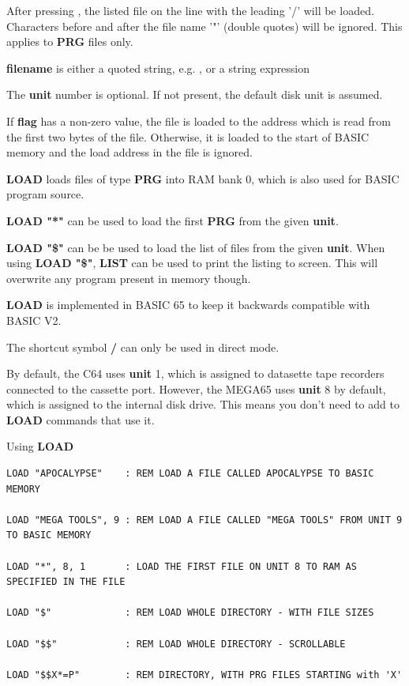 \begin{description}[leftmargin=2cm,style=nextline]
                  After pressing , the listed file on the line with the leading '/' will be loaded. Characters before and after the file name '"' (double quotes) will be ignored. This applies to {\bf PRG} files only.

                  {\bf filename} is either a quoted string, e.g. , or a string expression 

                  The {\bf unit} number is optional. If not present, the default disk unit is assumed.

                  If {\bf flag} has a non-zero value, the file is loaded to the address which is read from the first two bytes of the file. Otherwise, it is loaded to the start of BASIC memory and the load address in the file is ignored.

\item [Remarks:]  {\bf LOAD} loads files of type {\bf PRG} into RAM bank 0, which is also used for BASIC program source.

                  {\bf LOAD "*"} can be used to load the first {\bf PRG} from the given {\bf unit}.

                  {\bf LOAD "\$"} can be be used to load the list of files from the given {\bf unit}. When using {\bf LOAD "\$"}, {\bf LIST} can be used to print the listing to screen. This will overwrite any program present in memory though.

                  {\bf LOAD} is implemented in BASIC 65 to keep it backwards compatible with BASIC V2.

                  The shortcut symbol {\bf /} can only be used in direct mode.

                  By default, the C64 uses {\bf unit} 1, which is assigned to datasette tape recorders connected to the cassette port. However, the MEGA65 uses {\bf unit} 8 by default, which is assigned to the internal disk drive. This means you don't need to add  to {\bf LOAD} commands that use it.

\item [Examples:] Using {\bf LOAD}

\begin{tcolorbox}[colback=black,coltext=white]
\verbatimfont{\codefont}
\begin{verbatim}
LOAD "APOCALYPSE"    : REM LOAD A FILE CALLED APOCALYPSE TO BASIC MEMORY

LOAD "MEGA TOOLS", 9 : REM LOAD A FILE CALLED "MEGA TOOLS" FROM UNIT 9 TO BASIC MEMORY

LOAD "*", 8, 1       : LOAD THE FIRST FILE ON UNIT 8 TO RAM AS SPECIFIED IN THE FILE

LOAD "$"             : REM LOAD WHOLE DIRECTORY - WITH FILE SIZES

LOAD "$$"            : REM LOAD WHOLE DIRECTORY - SCROLLABLE

LOAD "$$X*=P"        : REM DIRECTORY, WITH PRG FILES STARTING with 'X'
\end{verbatim}
\end{tcolorbox}
\end{description}

